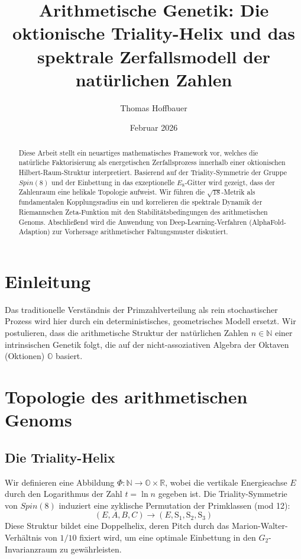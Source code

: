 \documentclass[11pt,a4paper]{article}
\title{Arithmetische Genetik: Die oktionische Triality-Helix und das spektrale Zerfallsmodell der natürlichen Zahlen}
\author{Thomas Hoffbauer}
\date{Februar 2026}
\newcommand{\Okt}{\mathbb{O}}
\newcommand{\Real}{\mathbb{R}}
\newcommand{\Nat}{\mathbb{N}}
\newcommand{\SpinEight}{Spin(8)}
\begin{document}
	
	\maketitle
	
	\begin{abstract}
		Diese Arbeit stellt ein neuartiges mathematisches Framework vor, welches die natürliche Faktorisierung als energetischen Zerfallsprozess innerhalb einer oktionischen Hilbert-Raum-Struktur interpretiert. Basierend auf der Triality-Symmetrie der Gruppe $Spin(8)$ und der Einbettung in das exzeptionelle $E_8$-Gitter wird gezeigt, dass der Zahlenraum eine helikale Topologie aufweist. Wir führen die $\sqrt{18}$-Metrik als fundamentalen Kopplungsradius ein und korrelieren die spektrale Dynamik der Riemannschen Zeta-Funktion mit den Stabilitätsbedingungen des arithmetischen Genoms. Abschließend wird die Anwendung von Deep-Learning-Verfahren (AlphaFold-Adaption) zur Vorhersage arithmetischer Faltungsmuster diskutiert.
	\end{abstract}
	
	\section{Einleitung}
	Das traditionelle Verständnis der Primzahlverteilung als rein stochastischer Prozess wird hier durch ein deterministisches, geometrisches Modell ersetzt. Wir postulieren, dass die arithmetische Struktur der natürlichen Zahlen $n \in \Nat$ einer intrinsischen Genetik folgt, die auf der nicht-assoziativen Algebra der Oktaven (Oktionen) $\Okt$ basiert.
	
	\section{Topologie des arithmetischen Genoms}
	
	\subsection{Die Triality-Helix}
	Wir definieren eine Abbildung $\Phi: \Nat \to \Okt \times \Real$, wobei die vertikale Energieachse $E$ durch den Logarithmus der Zahl $t = \ln n$ gegeben ist. Die Triality-Symmetrie von $\SpinEight$ induziert eine zyklische Permutation der Primklassen (mod 12):
	\begin{equation}
		(E, A, B, C) \to (E, \text{S}_1, \text{S}_2, \text{S}_3)
	\end{equation}
	Diese Struktur bildet eine Doppelhelix, deren Pitch durch das Marion-Walter-Verhältnis von $1/10$ fixiert wird, um eine optimale Einbettung in den $G_2$-Invarianzraum zu gewährleisten.
	
\end{document}
